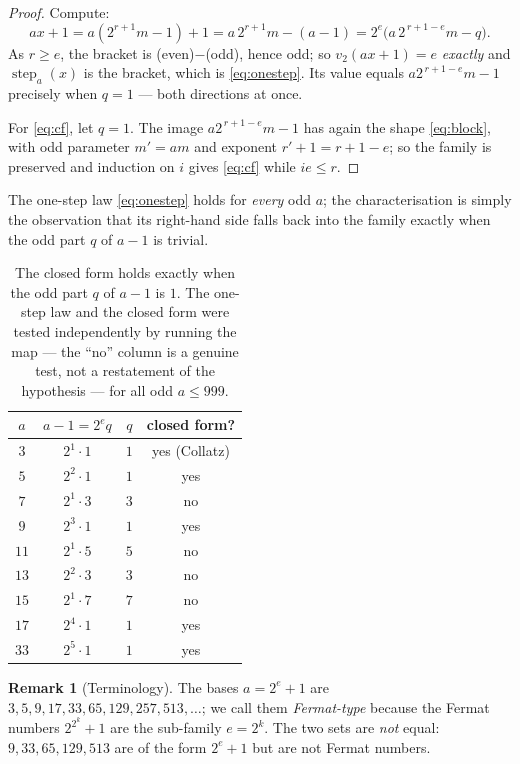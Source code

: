 \documentclass[11pt,a4paper]{article}
\theoremstyle{plain}
\theoremstyle{definition}
\newtheorem{remark}[theorem]{Remark}
\begin{document}
\begin{proof}
Compute:
\[
  ax+1=a(2^{r+1}m-1)+1=a\,2^{r+1}m-(a-1)=2^{e}\bigl(a\,2^{\,r+1-e}m-q\bigr).
\]
As $r\ge e$, the bracket is (even)$-$(odd), hence odd; so $v_2(ax+1)=e$ \emph{exactly} and
$\operatorname{step}_a(x)$ is the bracket, which is \eqref{eq:onestep}. Its value equals
$a2^{\,r+1-e}m-1$ precisely when $q=1$ --- both directions at once.

For \eqref{eq:cf}, let $q=1$. The image $a2^{\,r+1-e}m-1$ has again the shape
\eqref{eq:block}, with odd parameter $m'=am$ and exponent $r'+1=r+1-e$; so the family is
preserved and induction on $i$ gives \eqref{eq:cf} while $ie\le r$.
\end{proof}

\noindent The one-step law \eqref{eq:onestep} holds for \emph{every} odd $a$; the
characterisation is simply the observation that its right-hand side falls back into the
family exactly when the odd part $q$ of $a-1$ is trivial.

\begin{table}[ht]\centering
\begin{tabular}{c c c c}
\toprule
$a$ & $a-1=2^{e}q$ & $q$ & closed form?\\\midrule
$3$  & $2^1\cdot1$ & $1$ & yes (Collatz)\\
$5$  & $2^2\cdot1$ & $1$ & yes\\
$7$  & $2^1\cdot3$ & $3$ & no\\
$9$  & $2^3\cdot1$ & $1$ & yes\\
$11$ & $2^1\cdot5$ & $5$ & no\\
$13$ & $2^2\cdot3$ & $3$ & no\\
$15$ & $2^1\cdot7$ & $7$ & no\\
$17$ & $2^4\cdot1$ & $1$ & yes\\
$33$ & $2^5\cdot1$ & $1$ & yes\\
\bottomrule
\end{tabular}
\caption{The closed form holds exactly when the odd part $q$ of $a-1$ is $1$. The one-step
law and the closed form were tested independently by running the map --- the ``no'' column is
a genuine test, not a restatement of the hypothesis --- for all odd $a\le999$.}
\end{table}

\begin{remark}[Terminology]
The bases $a=2^e+1$ are $3,5,9,17,33,65,129,257,513,\dots$; we call them \emph{Fermat-type}
because the Fermat numbers $2^{2^k}+1$ are the sub-family $e=2^k$. The two sets are
\emph{not} equal: $9,33,65,129,513$ are of the form $2^e+1$ but are not Fermat numbers.
\end{remark}
\end{document}
